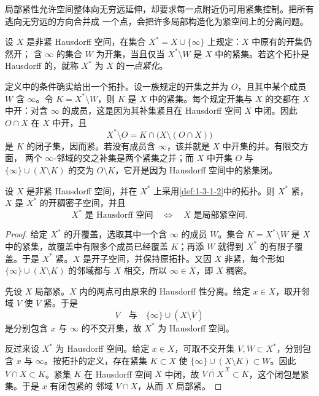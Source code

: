 局部紧性允许空间整体向无穷远延伸，却要求每一点附近仍可用紧集控制。把所有逃向无穷远的方向合并成
一个点，会把许多局部构造化为紧空间上的分离问题。

\begin{definition}[一点紧化拓扑]\label{def:1-3-1-2}
设 $X$ 是非紧 Hausdorff 空间，在集合 $X^*=X\cup\{\infty\}$ 上规定：$X$ 中原有的开集仍然开；
含 $\infty$ 的集合 $W$ 为开集，当且仅当 $X^*\setminus W$ 是 $X$ 中的紧集。若这个拓扑是
Hausdorff 的，就称 $X^*$ 为 $X$ 的\emph{一点紧化}。
\end{definition}

定义中的条件确实给出一个拓扑。设一族规定的开集之并为 $O$，且其中某个成员 $W$ 含 $\infty$。令
$K=X^*\setminus W$，则 $K$ 是 $X$ 中的紧集。每个规定开集与 $X$ 的交都在 $X$ 中开：对含
$\infty$ 的成员，这是因为其补集紧且在 Hausdorff 空间 $X$ 中闭。因此 $O\cap X$ 在 $X$ 中开，且
\[
 X^*\setminus O=K\cap\bigl(X\setminus(O\cap X)\bigr)
\]
是 $K$ 的闭子集，因而紧。若没有成员含 $\infty$，该并就是 $X$ 中开集的并。有限交方面，
两个 $\infty$-邻域的交之补集是两个紧集之并；而 $X$ 中开集 $O$ 与
$\{\infty\}\cup(X\setminus K)$ 的交为 $O\setminus K$，它开是因为 Hausdorff 空间中的紧集闭。

\begin{proposition}[一点紧化判据]\label{proposition:1-3-1-one-point-compactification}
设 $X$ 是非紧 Hausdorff 空间，并在 $X^*$ 上采用\cref{def:1-3-1-2}中的拓扑。则 $X^*$ 紧，
$X$ 是 $X^*$ 的开稠密子空间，并且
\[
  X^*\text{ 是 Hausdorff 空间}
  \quad\Longleftrightarrow\quad
  X\text{ 是局部紧空间}.
\]
\end{proposition}

\begin{proof}
给定 $X^*$ 的开覆盖，选取其中一个含 $\infty$ 的成员 $W$。集合
$K=X^*\setminus W$ 是 $X$ 中的紧集，故覆盖中有限多个成员已经覆盖 $K$；再添 $W$ 就得到
$X^*$ 的有限子覆盖。于是 $X^*$ 紧。$X$ 是开子空间，并保持原拓扑。又因 $X$ 非紧，每个形如
$\{\infty\}\cup(X\setminus K)$ 的邻域都与 $X$ 相交，所以 $\infty\in\overline X$，即 $X$ 稠密。

先设 $X$ 局部紧。$X$ 内的两点可由原来的 Hausdorff 性分离。给定 $x\in X$，取开邻域 $V$
使 $\overline V$ 紧。于是
\[
  V
  \quad\text{与}\quad
  \{\infty\}\cup(X\setminus\overline V)
\]
是分别包含 $x$ 与 $\infty$ 的不交开集，故 $X^*$ 为 Hausdorff 空间。

反过来设 $X^*$ 为 Hausdorff 空间。给定 $x\in X$，可取不交开集 $V,W\subset X^*$，分别包含
$x$ 与 $\infty$。按拓扑的定义，存在紧集 $K\subset X$ 使
$\{\infty\}\cup(X\setminus K)\subset W$。因此 $V\cap X\subset K$。紧集 $K$ 在 Hausdorff
空间 $X$ 中闭，故 $\overline{V\cap X}^{\,X}\subset K$，这个闭包是紧集。于是 $x$ 有闭包紧的
邻域 $V\cap X$，从而 $X$ 局部紧。
\end{proof}

